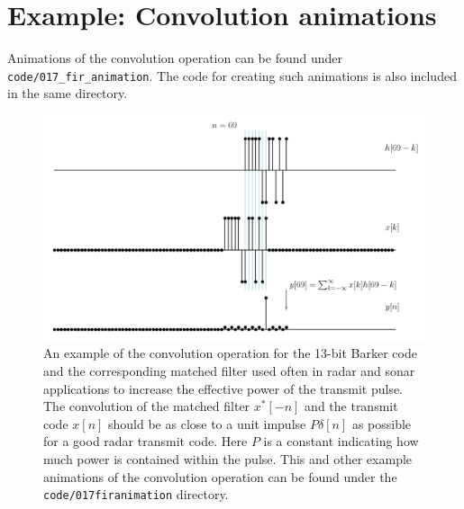 \section{Example: Convolution animations}

Animations of the convolution operation can be found
under \verb|code/017_fir_animation|. The code for creating such
animations is also included in the same directory.

\begin{figure}
\includegraphics[width=\textwidth]{ch10/figures/ex_animation.png}
\caption{An example of the convolution operation for the 13-bit Barker code and the corresponding matched filter used often in radar and sonar applications to increase the effective power of the transmit pulse. The convolution of the matched filter $x^*[-n]$ and the transmit code $x[n]$ should be as close to a unit impulse $P\delta[n]$ as possible for a good radar transmit code. Here $P$ is a constant indicating how much power is contained within the pulse. This and other example animations of the convolution operation can be found under the \texttt{code/017firanimation} directory.}
\label{fig:fir_animation_example}
\end{figure}



